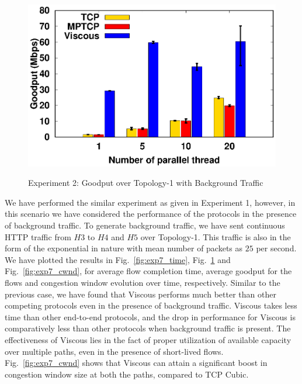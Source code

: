 \begin{figure}[!t]
\begin{center}
\begin{minipage}{0.45\linewidth}
			\label{fig:exp7_goodput_160}
		\end{minipage}
		\begin{minipage}{0.45\linewidth}
			\centering
			\includegraphics[width=\linewidth]{img/exp7/goodput_20}
			\label{fig:exp7_goodput_320}
		\end{minipage}
		\caption{\label{fig:exp7_goodput}Experiment 2: Goodput over Topology-1 with Background Traffic}
	\end{center}
\end{figure}



We have performed the similar experiment as given in Experiment 1, however, in this scenario we have considered the performance of the protocols in the presence of  background traffic. To generate background traffic, we have sent continuous HTTP traffic from $H3$ to $H4$ and $H5$ over Topology-1. This traffic is also in the form of the exponential in nature with mean number of packets as $25$ per second. We have plotted the results in Fig.~\ref{fig:exp7_time}, Fig.~\ref{fig:exp7_goodput} and Fig.~\ref{fig:exp7_cwnd}, for average flow completion time, average goodput for the flows and congestion window evolution over time, respectively. Similar to the previous case, we have found that Viscous performs much better than other competing protocols even in the presence of background traffic. Viscous takes less time than other end-to-end protocols, and the drop in performance for Viscous is comparatively less than other protocols when background traffic is present. The effectiveness of Viscous lies in the fact of proper utilization of available capacity over multiple paths, even in the presence of short-lived flows. Fig.~\ref{fig:exp7_cwnd} shows that Viscous can attain a significant boost in congestion window size at both the paths, compared to TCP Cubic. 

